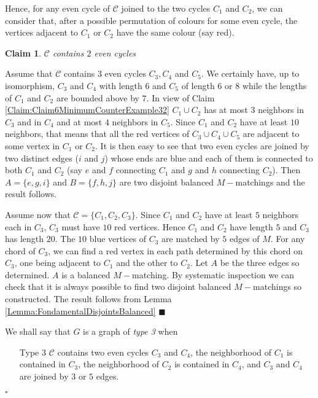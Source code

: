 \documentclass{elsart}
\theoremstyle{plain} \theoremheaderfont{\scshape}
\newtheorem{Clm}{Claim}[Thm]
\newenvironment{Prf}{{\bf \noindent Proof } }{\hfill$\square$\\}
\newenvironment{PrfClaim}{{\bf Proof }}{{\hfill\tiny{$\blacksquare$\\}}}
\begin{document}
\begin{Prf}
Hence, for any even cycle of $\mathcal C$  joined to the two cycles
$C_1$ and $C_2$, we can consider that, after a possible permutation
of colours for some even cycle,  the vertices adjacent to $C_1$ or
$C_2$ have the same colour (say red).

\begin{Clm} \label{Claim:Claim7MinimumCounterExample32}
$\mathcal C$ contains $2$ even cycles
\end{Clm}
\begin{PrfClaim}
Assume that $\mathcal C$ contains $3$ even cycles $C_3,C_4$ and
$C_5$. We certainly have, up to isomorphism, $C_3$ and $C_4$ with
length $6$ and $C_5$ of length $6$ or $8$ while the lengths of $C_1$
and $C_2$ are bounded above by $7$. In view of Claim
\ref{Claim:Claim6MinimumCounterExample32} $C_1 \cup C_2$ has at most
$3$ neighbors in $C_3$ and in $C_4$ and at most $4$ neighbors in
$C_5$. Since $C_1$ and $C_2$ have at least $10$ neighbors, that
means that all the red vertices of $C_3 \cup C_4 \cup C_5$ are
adjacent to some vertex in $C_1$ or $C_2$. It is then easy to see
that two even cycles are joined  by two distinct edges ($i$ and $j$)
whose ends are blue and each of them is connected to both $C_1$ and
$C_2$ (say $e$ and $f$ connecting  $C_1$ and $g$ and $h$ connecting
$C_2$). Then $A=\{e,g,i\}$ and $B=\{f,h,j\}$ are two disjoint
balanced $M-$matchings and the result follows.

 Assume now that
$\mathcal C= \{C_1,C_2,C_3\}$. Since $C_1$ and $C_2$ have at least
$5$ neighbors each in  $C_3$, $C_3$ must have $10$ red vertices.
Hence $C_1$ and $C_2$ have length $5$ and $C_3$ has length $20$. The
$10$ blue vertices of $C_3$ are matched by $5$ edges of $M$. For any
chord of $C_3$, we can find a red vertex in each path determined by
this chord on $C_3$, one being adjacent to $C_1$ and the other to
$C_2$. Let $A$ be the three edges so determined. $A$ is a balanced
$M-$matching. By systematic inspection we can check that it is
always possible to find two disjoint balanced $M-$matchings so
constructed. The result follows from Lemma
\ref{Lemma:FondamentalDisjointsBalanced}
\end{PrfClaim}

We shall say that $G$ is a graph of {\em type 3} when
\begin{itemize}
  \item [Type 3]$\mathcal C$ contains two even cycles $C_3$ and $C_4$, the
neighborhood of $C_1$ is contained in $C_3$, the neighborhood of
$C_2$ is contained in $C_4$, and $C_3$ and $C_4$ are joined by $3$
or $5$ edges.
\end{itemize}



\end{Prf}
\end{document}
